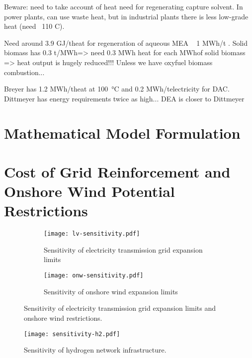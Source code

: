 Beware: need to take account of heat need for regenerating \co capture solvent.
In power plants, can use waste heat, but in industrial plants there is less
low-grade heat (need ~110 C). 

Need around 3.9 GJ/t\co heat for regeneration of aqueous MEA ~ 1 MWh/t\co
{}. Solid biomass has 0.3 t\co/MWh\th => need 0.3 MWh heat for
each MWh\th of solid biomass => heat output is hugely reduced!!! Unless we have
oxyfuel biomass combustion...

Breyer 
has 1.2 MWh/t\co heat at \SI{100}{\celsius} and 0.2 MWh\el/t\co electricity for DAC.
Dittmeyer has energy requirements twice as high... DEA is closer to Dittmeyer



\section{Mathematical Model Formulation}
\label{sec:si:math}

\section{Cost of Grid Reinforcement and Onshore Wind Potential Restrictions}
\label{sec:si:sensitivity-lv-onw}

\begin{figure}
    \centering
    \begin{subfigure}[t]{\textwidth}
        \centering
        \caption{Sensitivity of electricity transmission grid expansion limits}
        \texttt{[image: lv-sensitivity.pdf]}
    \end{subfigure}
    \begin{subfigure}[t]{\textwidth}
        \centering
        \caption{Sensitivity of onshore wind expansion limits}
        \texttt{[image: onw-sensitivity.pdf]}
    \end{subfigure}
    \caption{Sensitivity of electricity transmission grid expansion limits and onshore wind restrictions.}
    \label{fig:lv-onw-restriction}
\end{figure}

\begin{SCfigure}
    \centering
    \texttt{[image: sensitivity-h2.pdf]}
    \caption{Sensitivity of hydrogen network infrastructure.}
    \label{fig:h2-restriction}
\end{SCfigure}

